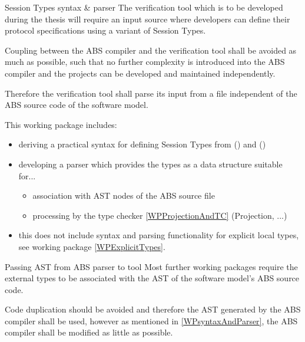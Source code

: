\documentclass[paper=a4,nochapname,accentcolor=tud9c]{tudexercise}
\makeatletter
\newcommand\textcitep[1]{\mkbibparens{\textcite{#1}}}
\def\namedlabel#1#2{\begingroup
    #1%
    \def\@currentlabel{\thedescriptcount}%
    \phantomsection\label{#2}\endgroup
}
\newcounter{descriptcount}
\renewcommand*\thedescriptcount{[\Alph{descriptcount}]}}
\renewcommand*\thedescriptcount{\roman{descriptcount}}}
\makeatother
\begin{document}
\begin{enumdescript}
\item[\namedlabel{Session Types syntax \& parser}{WPsyntaxAndParser}]%
    The verification tool which is to be developed during the thesis will require
    an input source where developers can define their protocol specifications using a variant of Session Types.

    Coupling between the ABS compiler and the verification tool shall be avoided
    as much as possible, such that no further complexity is introduced into the ABS
    compiler and the projects can be developed and maintained independently.
    
    Therefore the verification tool shall parse its input from a file independent of the ABS source code of the software model.

    This working package includes:
    \begin{itemize}
      \item deriving a practical syntax for defining Session Types from \textcitep{kamburjan2018stateful} and \textcitep{kamburjan2016session}
      \item developing a parser which provides the types as a data structure
        suitable for...
      \begin{itemize}
        \item association with AST nodes of the ABS source file
        \item processing by the type checker \ref{WPProjectionAndTC} (Projection, ...)
      \end{itemize}
      \item this does not include syntax and parsing functionality for explicit
        local types, see working package \ref{WPExplicitTypes}.
    \end{itemize}
  \item[\namedlabel{Passing AST from ABS parser to tool}{WPPassAST}]%
    Most further working packages require the external types to be associated with
    the AST of the software model's ABS source code.

    Code duplication should be avoided and therefore the AST generated by the
    ABS compiler shall be used, however as mentioned in \ref{WPsyntaxAndParser},
    the ABS compiler shall be modified as little as possible.


\end{enumdescript}
\end{document}
